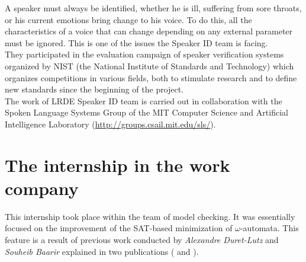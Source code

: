 A speaker must always be identified, whether he is ill, suffering from sore throats, or his
current emotions bring change to his voice. To do this, all the characteristics of a voice that can change
depending on any external parameter must be ignored. This is one of the issues the Speaker ID team is
facing.\\

They participated in the evaluation campaign of speaker verification systems organized by NIST
(the National Institute of Standards and Technology) which organizes competitions in various fields, both
to stimulate research and to define new standards since the beginning of the project.\\

The work of LRDE Speaker ID team is carried out in collaboration with the Spoken Language Systems Group of
the MIT Computer Science and Artificial Intelligence Laboratory (\url{http://groups.csail.mit.edu/sls/}).


\section{The internship in the work company}
This internship took place within the team of model checking. It was essentially focused on
the improvement of the SAT-based minimization of $\omega$-automata. This feature is a result of
previous work conducted by \textit{Alexandre Duret-Lutz} and \textit{Souheib Baarir} explained in two
publications (\cite{14} and \cite{15}).
